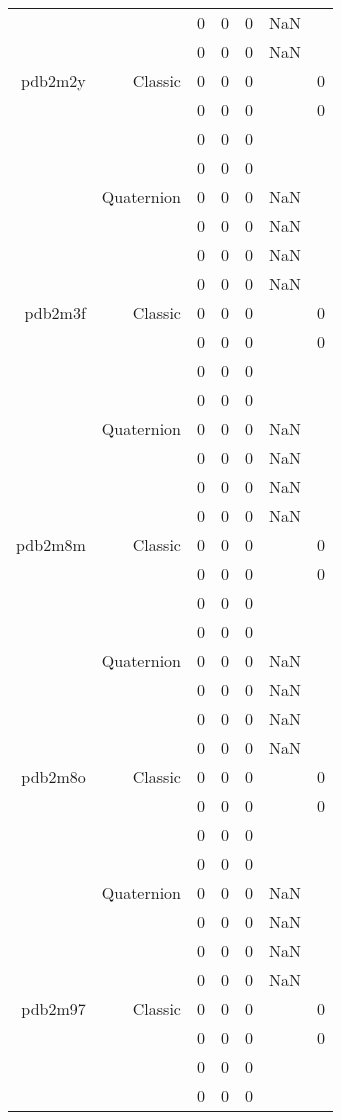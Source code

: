 \begin{xltabular}{\textwidth}{r|rcccSc}
& & 0 & 0 & 0 & NaN & \\
& & 0 & 0 & 0 & NaN & \\ \addlinespace
pdb2m2y & Classic & 0 & 0 & 0 & & 0 \\
& & 0 & 0 & 0 & & 0 \\
& & 0 & 0 & 0 & & \\
& & 0 & 0 & 0 & & \\
& Quaternion & 0 & 0 & 0 & NaN & \\
& & 0 & 0 & 0 & NaN & \\
& & 0 & 0 & 0 & NaN & \\
& & 0 & 0 & 0 & NaN & \\ \addlinespace
pdb2m3f & Classic & 0 & 0 & 0 & & 0 \\
& & 0 & 0 & 0 & & 0 \\
& & 0 & 0 & 0 & & \\
& & 0 & 0 & 0 & & \\
& Quaternion & 0 & 0 & 0 & NaN & \\
& & 0 & 0 & 0 & NaN & \\
& & 0 & 0 & 0 & NaN & \\
& & 0 & 0 & 0 & NaN & \\ \addlinespace
pdb2m8m & Classic & 0 & 0 & 0 & & 0 \\
& & 0 & 0 & 0 & & 0 \\
& & 0 & 0 & 0 & & \\
& & 0 & 0 & 0 & & \\
& Quaternion & 0 & 0 & 0 & NaN & \\
& & 0 & 0 & 0 & NaN & \\
& & 0 & 0 & 0 & NaN & \\
& & 0 & 0 & 0 & NaN & \\ \addlinespace
pdb2m8o & Classic & 0 & 0 & 0 & & 0 \\
& & 0 & 0 & 0 & & 0 \\
& & 0 & 0 & 0 & & \\
& & 0 & 0 & 0 & & \\
& Quaternion & 0 & 0 & 0 & NaN & \\
& & 0 & 0 & 0 & NaN & \\
& & 0 & 0 & 0 & NaN & \\
& & 0 & 0 & 0 & NaN & \\ \addlinespace
pdb2m97 & Classic & 0 & 0 & 0 & & 0 \\
& & 0 & 0 & 0 & & 0 \\
& & 0 & 0 & 0 & & \\
& & 0 & 0 & 0 & & \\

\end{xltabular}

